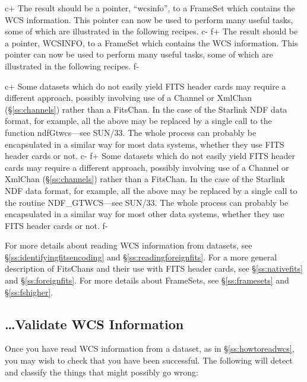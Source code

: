 \documentclass[twoside,11pt]{article}
\newcommand{\xref}[3]{#1}
\newcommand{\secref}[1]{\S\ref{#1}}
\newcommand{\secref}[1]{\ref{#1}}
\begin{document}
c+
The result should be a pointer, ``wcsinfo'', to a FrameSet which
contains the WCS information. This pointer can now be used to perform
many useful tasks, some of which are illustrated in the following
recipes.
c-
f+
The result should be a pointer, WCSINFO, to a FrameSet which contains
the WCS information. This pointer can now be used to perform many
useful tasks, some of which are illustrated in the following recipes.
f-

c+
Some datasets which do not easily yield FITS header cards may require
a different approach, possibly involving use of a Channel or XmlChan
(\secref{ss:channels}) rather than a FitsChan. In the case of the
Starlink NDF data format, for example, all the above may be replaced
by a single call to the function
\xref{ndfGtwcs}{sun33}{ndfGtwcs}---see \xref{SUN/33}{sun33}{}.  The
whole process can probably be encapsulated in a similar way for
most data systems, whether they use FITS header cards or not.
c-
f+
Some datasets which do not easily yield FITS header cards may require
a different approach, possibly involving use of a Channel or XmlChan
(\secref{ss:channels}) rather than a FitsChan. In the case of the
Starlink NDF data format, for example, all the above may be replaced
by a single call to the routine
\xref{NDF\_GTWCS}{sun33}{NDF_GTWCS}---see \xref{SUN/33}{sun33}{}.  The
whole process can probably be encapsulated in a similar way for most
other data systems, whether they use FITS header cards or not.
f-

For more details about reading WCS information from datasets, see
\secref{ss:identifyingfitsencoding} and
\secref{ss:readingforeignfits}. For a more general description of
FitsChans and their use with FITS header cards, see
\secref{ss:nativefits} and \secref{ss:foreignfits}. For more details
about FrameSets, see \secref{ss:framesets} and \secref{ss:fshigher}.

\subsection{\ldots Validate WCS Information}

Once you have read WCS information from a dataset, as in
\secref{ss:howtoreadwcs}, you may wish to check that you have been
successful. The following will detect and classify the things that
might possibly go wrong:
\end{document}

